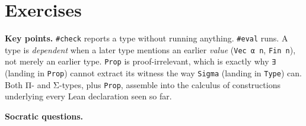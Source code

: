 \section{Exercises}\label{sec:01-basics:06-exercises:1}

\textbf{Key points.} \texttt{\#check} reports a type without running anything. \texttt{\#eval} runs. A type is \emph{dependent} when a later type mentions an earlier \emph{value} (\texttt{Vec α n}, \texttt{Fin n}), not merely an earlier type. \texttt{Prop} is proof-irrelevant, which is exactly why \texttt{∃} (landing in \texttt{Prop}) cannot extract its witness the way \texttt{Sigma} (landing in \texttt{Type}) can. Both Π- and Σ-types, plus \texttt{Prop}, assemble into the calculus of constructions underlying every Lean declaration seen so far.

\textbf{Socratic questions.}

